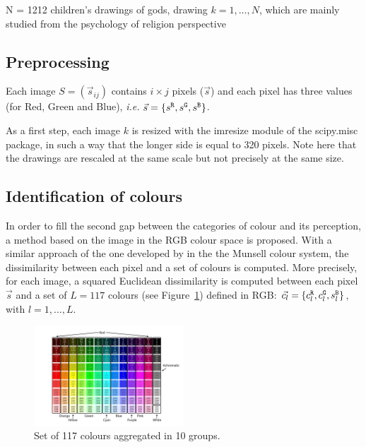 \documentclass[11pt,a4paper]{article}
\begin{document}
N = 1212 children's drawings of gods, drawing
$k = 1,\dots, N$, which are mainly studied from the psychology of
religion perspective %

\subsection{Preprocessing}
Each image $S = (\vec{s}_{ij})$ contains $i \times j$
pixels ($\vec{s}$) and each pixel has three values (for Red, Green and Blue), \textit{i.e.}
$\vec{s} = \{ s^{\tt \scriptstyle R}, s^{\tt \scriptstyle G}, s^{\tt \scriptstyle B} \}$.

As a first step, each image $k$ is resized with the imresize
module of the scipy.misc package, in such a way that the longer side is
equal to 320 pixels. Note here that the drawings are
rescaled at the same scale but not precisely at the same size.


\subsection{Identification of colours}
\label{sec:identification}




In order to fill the second gap between the categories of colour and its
perception, a method based on the image in the RGB colour space is
proposed. With a similar approach of the one developed by
\cite{kimbaelee2007} in the the Munsell colour system, the dissimilarity
between each pixel and a set of colours is computed. More precisely, for
each image, a squared Euclidean dissimilarity is computed between each
pixel \(\vec{s}\) and a set of $L = 117$ colours (see Figure~\ref{colour_set}) defined in RGB:
\(\vec{c_l} = \{ c^{\tt \scriptstyle R}_{l}, c^{\tt \scriptstyle G}_{l}, s^{\tt \scriptstyle B}_{l} \}\),
with $l = 1, ..., L$.

\begin{figure}
	\centering
	\includegraphics[width=0.5\textwidth]{figures/Col_tab.pdf}
	\caption{Set of 117 colours aggregated in 10 groups. \label{colour_set}}
\end{figure}
\end{document}
